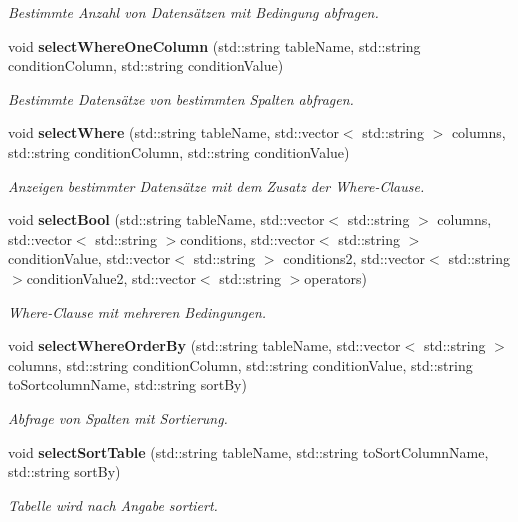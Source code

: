 \begin{DoxyCompactItemize}
\begin{DoxyCompactList}\small\item\em Bestimmte Anzahl von Datensätzen mit Bedingung abfragen. \end{DoxyCompactList}\item 
void \textbf{ select\+Where\+One\+Column} (std\+::string table\+Name, std\+::string condition\+Column, std\+::string condition\+Value)
\begin{DoxyCompactList}\small\item\em Bestimmte Datensätze von bestimmten Spalten abfragen. \end{DoxyCompactList}\item 
void \textbf{ select\+Where} (std\+::string table\+Name, std\+::vector$<$ std\+::string $>$ columns, std\+::string condition\+Column, std\+::string condition\+Value)
\begin{DoxyCompactList}\small\item\em Anzeigen bestimmter Datensätze mit dem Zusatz der Where-\/\+Clause. \end{DoxyCompactList}\item 
void \textbf{ select\+Bool} (std\+::string table\+Name, std\+::vector$<$ std\+::string $>$ columns, std\+::vector$<$ std\+::string $>$conditions, std\+::vector$<$ std\+::string $>$condition\+Value, std\+::vector$<$ std\+::string $>$ conditions2, std\+::vector$<$ std\+::string $>$condition\+Value2, std\+::vector$<$ std\+::string $>$operators)
\begin{DoxyCompactList}\small\item\em Where-\/\+Clause mit mehreren Bedingungen. \end{DoxyCompactList}\item 
void \textbf{ select\+Where\+Order\+By} (std\+::string table\+Name, std\+::vector$<$ std\+::string $>$ columns, std\+::string condition\+Column, std\+::string condition\+Value, std\+::string to\+Sortcolumn\+Name, std\+::string sort\+By)
\begin{DoxyCompactList}\small\item\em Abfrage von Spalten mit Sortierung. \end{DoxyCompactList}\item 
void \textbf{ select\+Sort\+Table} (std\+::string table\+Name, std\+::string to\+Sort\+Column\+Name, std\+::string sort\+By)
\begin{DoxyCompactList}\small\item\em Tabelle wird nach Angabe sortiert. \end{DoxyCompactList}\item 

\end{DoxyCompactItemize}
